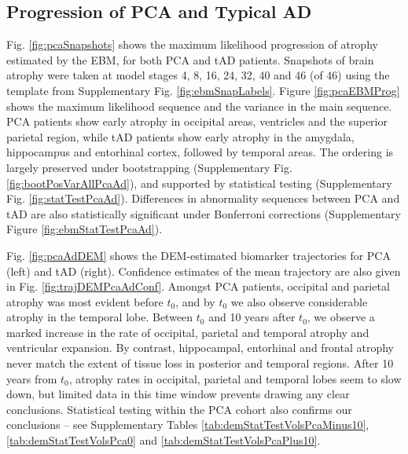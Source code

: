 \newcommand*{\scaleBrainImg}{0.25}


\newcommand*{\snapLocationPCA}{\pcaPaperFigs/ebmSnapshotsPCA}
\newcommand*{\snapLocationAD}{\pcaPaperFigs/ebmSnapshotsAD} 
\newcommand*{\snapLocationEAR}{\pcaPaperFigs/ebmSnapshotsEAR} 
\newcommand*{\snapLocationPER}{\pcaPaperFigs/ebmSnapshotsPER} 
\newcommand*{\snapLocationSPA}{\pcaPaperFigs/ebmSnapshotsSPA} 

\newcommand*{\snapScale}{0.6} 

\subsection{Progression of PCA and Typical AD}
\label{sec:pcaResPcaAd}

Fig. \ref{fig:pcaSnapshots} shows the maximum likelihood progression of atrophy estimated by the EBM, for both PCA and tAD patients. Snapshots of brain atrophy were taken at model stages 4, 8, 16, 24, 32, 40 and 46 (of 46) using the template from Supplementary Fig. \ref{fig:ebmSnapLabels}. Figure \ref{fig:pcaEBMProg} shows the maximum likelihood sequence and the variance in the main sequence. PCA patients show early atrophy in  occipital areas, ventricles and the superior parietal region, while tAD patients show early atrophy in the amygdala, hippocampus and entorhinal cortex, followed by temporal areas. The ordering is largely preserved under bootstrapping (Supplementary Fig. \ref{fig:bootPosVarAllPcaAd}), and supported by statistical testing (Supplementary Fig. \ref{fig:statTestPcaAd}). Differences in abnormality sequences between PCA and tAD are also statistically significant under Bonferroni corrections (Supplementary Figure \ref{fig:ebmStatTestPcaAd}).
 
Fig. \ref{fig:pcaAdDEM} shows the DEM-estimated biomarker trajectories for PCA (left) and tAD (right). Confidence estimates of the mean trajectory are also given in Fig. \ref{fig:trajDEMPcaAdConf}. Amongst PCA patients, occipital and parietal atrophy was most evident before $t_0$, and by $t_0$ we also observe considerable atrophy in the temporal lobe. Between $t_0$ and 10 years after $t_0$, we observe a marked increase in the rate of occipital, parietal and temporal atrophy and ventricular expansion. By contrast, hippocampal, entorhinal and frontal atrophy never match the extent of tissue loss in posterior and temporal regions. After 10 years from $t_0$, atrophy rates in occipital, parietal and temporal lobes seem to slow down, but limited data in this time window prevents drawing any clear conclusions. Statistical testing within the PCA cohort also confirms our conclusions -- see Supplementary Tables \ref{tab:demStatTestVolsPcaMinus10}, \ref{tab:demStatTestVolsPca0} and \ref{tab:demStatTestVolsPcaPlus10}.

